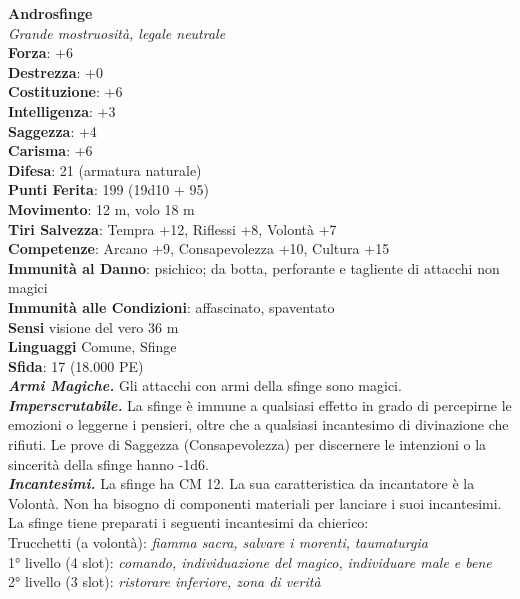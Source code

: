 \begin{multicols}{2}
\medskip\textbf{Androsfinge}\\
\emph{Grande mostruosità, legale neutrale}\\
\textbf{Forza}: +6\\
\textbf{Destrezza}: +0\\
\textbf{Costituzione}: +6\\
\textbf{Intelligenza}: +3\\
\textbf{Saggezza}: +4\\
\textbf{Carisma}: +6\\
\textbf{Difesa}: 21 (armatura naturale)\\
\textbf{Punti Ferita}: 199 (19d10 + 95)\\
\textbf{Movimento}: 12 m, volo 18 m\\
\textbf{Tiri Salvezza}: Tempra +12, Riflessi +8, Volontà +7\\
\textbf{Competenze}: Arcano +9, Consapevolezza +10, Cultura +15\\
\textbf{Immunità al Danno}: psichico; da botta, perforante e tagliente di attacchi non magici\\
\textbf{Immunità alle Condizioni}: affascinato, spaventato\\
\textbf{Sensi} visione del vero 36 m\\
\textbf{Linguaggi} Comune, Sfinge\\
\textbf{Sfida}: 17 (18.000 PE)\smallskip\\
\emph{\textbf{Armi Magiche.}} Gli attacchi con armi della sfinge sono magici.\\
\emph{\textbf{Imperscrutabile.}} La sfinge è immune a qualsiasi effetto in grado di percepirne le emozioni o leggerne i pensieri, oltre che a qualsiasi incantesimo di divinazione che rifiuti. Le prove di Saggezza (Consapevolezza) per discernere le intenzioni o la sincerità della sfinge hanno -1d6.\\
\emph{\textbf{Incantesimi.}} La sfinge ha CM 12. La sua caratteristica da incantatore è la Volontà. Non ha bisogno di componenti materiali per lanciare i suoi incantesimi. La sfinge tiene preparati i seguenti incantesimi da chierico:\\
Trucchetti (a volontà): \emph{fiamma sacra, salvare i morenti,} \emph{taumaturgia}\\
1° livello (4 slot): \emph{comando, individuazione del magico,} \emph{individuare male e bene}\\
2° livello (3 slot): \emph{ristorare inferiore, zona di verità}\\

\end{multicols}
